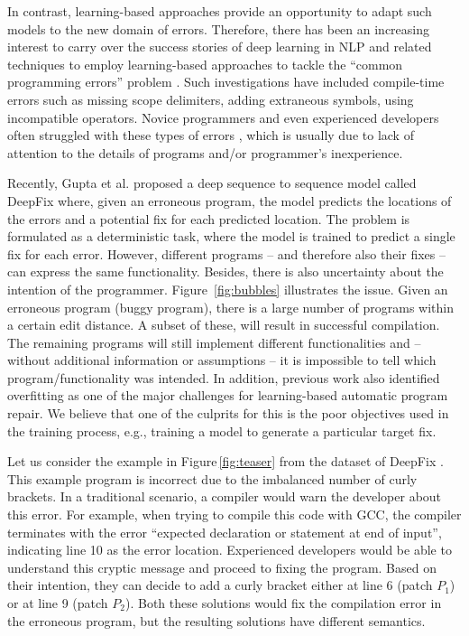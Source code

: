 \documentclass[runningheads]{llncs}
\newcommand{\figref}{Figure}
\begin{document}
In contrast, learning-based approaches provide an opportunity to adapt such models to the new domain of errors. Therefore, there has been an increasing interest to carry over the success stories of deep learning in NLP and related techniques to employ learning-based approaches to tackle the ``common programming errors'' problem \cite{Gupta2017DeepFixFC,gupta2019RLAssist}. Such investigations have included compile-time errors such as missing scope delimiters, adding extraneous symbols, using incompatible operators. Novice programmers and even experienced developers often struggled with these types of errors \cite{seo2014programmers}, which is usually due to lack of attention to the details of programs and/or programmer's inexperience. 

 Recently, Gupta et al. \cite{Gupta2017DeepFixFC} proposed a deep sequence to sequence model called DeepFix where, given an erroneous program, the model predicts the locations of the errors and a potential fix for each predicted location. The problem is formulated as a deterministic task, where the model is trained to predict a single fix for each error. However, different programs -- and therefore also their fixes -- can express the same functionality. Besides, there is also uncertainty about the intention of the programmer.
 \figref \, \ref{fig:bubbles} illustrates the issue. Given an erroneous program (buggy program), there is a large number of programs within a certain edit distance. A subset of these, will result in successful compilation. The remaining programs will still implement different functionalities and -- without additional information or assumptions -- it is impossible to tell which program/functionality was intended.
 In addition, previous work \cite{SmithBGB15} also identified overfitting as one of the major challenges for learning-based automatic program repair. We believe that one of the culprits for this is the poor objectives used in the training process, e.g., training a model to generate a particular target fix.
 
 Let us consider the example in \figref \,\ref{fig:teaser} from the dataset of DeepFix \cite{Gupta2017DeepFixFC}. This example program is incorrect due to the imbalanced number of curly brackets. In a traditional scenario, a compiler would warn the developer about this error. For example, when trying to compile this code with GCC, the compiler terminates with the error ``expected declaration or statement at end of input'', indicating line 10 as the error location. Experienced developers would be able to understand this cryptic message and proceed to fixing the program. Based on their intention, they can decide to add a curly bracket either at line 6 (patch $P_1$) or at line 9 (patch $P_2$). Both these solutions would fix the compilation error in the erroneous program, but the resulting solutions have different semantics. 
 
\end{document}
